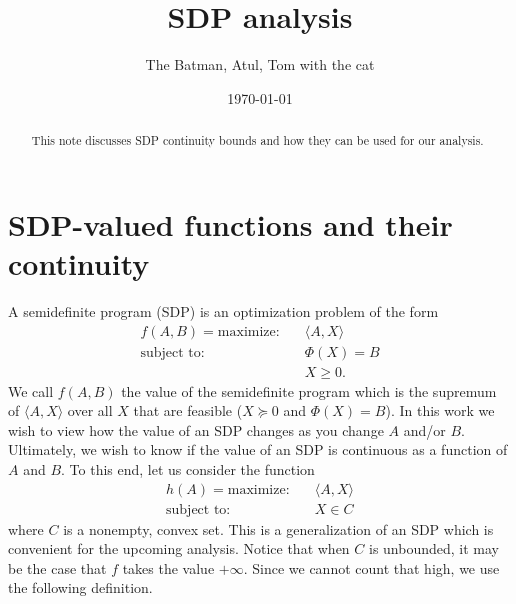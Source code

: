 \documentclass[11pt]{article}
\theoremstyle{definition}
\theoremstyle{definition}
\newcommand{\ip}[2]{\langle #1, #2 \rangle}
\begin{document}
\title{\bf SDP analysis}

\date{\today} 

\author{The Batman, Atul, Tom with the cat} 

\maketitle 

\begin{abstract} 
This note discusses SDP continuity bounds and how they can be used for our analysis. 
\end{abstract}

\tableofcontents 


\section{SDP-valued functions and their continuity} 

A semidefinite program (SDP) is an optimization problem of the form 
\begin{align} 
f(A,B) = \text{maximize:} \quad & \ip{A}{X} \nonumber \\ 
\text{subject to:} \quad 
& \Phi(X) = B \label{SDP} \\ 
& X \geq 0. \nonumber
\end{align}  
We call $f(A,B)$ the value of the semidefinite program which is the supremum of $\ip{A}{X}$ over all $X$ that are feasible ($X \succeq 0$ and $\Phi(X) = B$). 
In this work we wish to view how the value of an SDP changes as you change $A$ and/or $B$. 
Ultimately, we wish to know if the value of an SDP is continuous as a function of $A$ and $B$. 
To this end, let us consider the function 
\begin{align} 
h(A) = \text{maximize:} \quad & \ip{A}{X} \\ 
\text{subject to:} \quad 
& X \in C  
\end{align}   
where $C$ is a nonempty, convex set. 
This is a generalization of an SDP which is  convenient for the upcoming analysis.  
Notice that when $C$ is unbounded, it may be the case that $f$ takes the value $+ \infty$. 
Since we cannot count that high, we use the following definition. 
\end{document}
